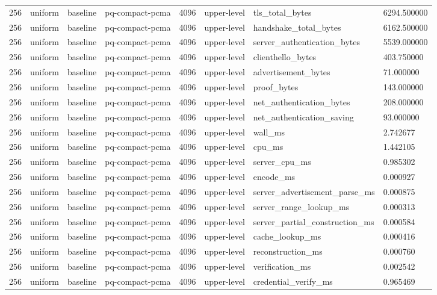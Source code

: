 \begin{tabular}{llllllll}
256 & uniform & baseline & pq-compact-pcma & 4096 & upper-level & tls\_total\_bytes & 6294.500000 \\
256 & uniform & baseline & pq-compact-pcma & 4096 & upper-level & handshake\_total\_bytes & 6162.500000 \\
256 & uniform & baseline & pq-compact-pcma & 4096 & upper-level & server\_authentication\_bytes & 5539.000000 \\
256 & uniform & baseline & pq-compact-pcma & 4096 & upper-level & clienthello\_bytes & 403.750000 \\
256 & uniform & baseline & pq-compact-pcma & 4096 & upper-level & advertisement\_bytes & 71.000000 \\
256 & uniform & baseline & pq-compact-pcma & 4096 & upper-level & proof\_bytes & 143.000000 \\
256 & uniform & baseline & pq-compact-pcma & 4096 & upper-level & net\_authentication\_bytes & 208.000000 \\
256 & uniform & baseline & pq-compact-pcma & 4096 & upper-level & net\_authentication\_saving & 93.000000 \\
256 & uniform & baseline & pq-compact-pcma & 4096 & upper-level & wall\_ms & 2.742677 \\
256 & uniform & baseline & pq-compact-pcma & 4096 & upper-level & cpu\_ms & 1.442105 \\
256 & uniform & baseline & pq-compact-pcma & 4096 & upper-level & server\_cpu\_ms & 0.985302 \\
256 & uniform & baseline & pq-compact-pcma & 4096 & upper-level & encode\_ms & 0.000927 \\
256 & uniform & baseline & pq-compact-pcma & 4096 & upper-level & server\_advertisement\_parse\_ms & 0.000875 \\
256 & uniform & baseline & pq-compact-pcma & 4096 & upper-level & server\_range\_lookup\_ms & 0.000313 \\
256 & uniform & baseline & pq-compact-pcma & 4096 & upper-level & server\_partial\_construction\_ms & 0.000584 \\
256 & uniform & baseline & pq-compact-pcma & 4096 & upper-level & cache\_lookup\_ms & 0.000416 \\
256 & uniform & baseline & pq-compact-pcma & 4096 & upper-level & reconstruction\_ms & 0.000760 \\
256 & uniform & baseline & pq-compact-pcma & 4096 & upper-level & verification\_ms & 0.002542 \\
256 & uniform & baseline & pq-compact-pcma & 4096 & upper-level & credential\_verify\_ms & 0.965469 \\

\end{tabular}
